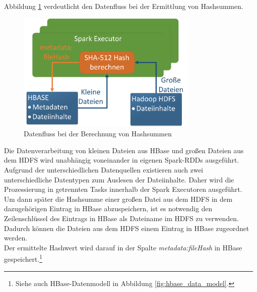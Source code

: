 \noindent
Abbildung \ref{fig:data_processing_hashes} verdeutlicht den Datenfluss bei der Ermittlung von Hashsummen.
\begin{figure}[ht]
  \centering
  \includegraphics[width=0.78\textwidth]{./resource/spark_processing_hashes.png}
  \caption{Datenfluss bei der Berechnung von Hashsummen}
  \label{fig:data_processing_hashes}
\end{figure}

\noindent
Die Datenverarbeitung von kleinen Dateien aus HBase und großen Dateien aus dem HDFS wird unabhängig voneinander in eigenen Spark-RDDs ausgeführt. Aufgrund der unterschiedlichen Datenquellen existieren auch zwei unterschiedliche Datentypen zum Auslesen der Dateiinhalte. Daher wird die Prozessierung in getrennten Tasks innerhalb der Spark Executoren ausgeführt. Um dann später die Hashsumme einer großen Datei aus dem HDFS in dem dazugehörigen Eintrag in HBase abzuspeichern, ist es notwendig den Zeilenschlüssel des Eintrags in HBase als Dateiname im HDFS zu verwenden. Dadurch können die Dateien aus dem HDFS einem Eintrag in HBase zugeordnet werden.\\
Der ermittelte Hashwert wird darauf in der Spalte \textit{metadata:fileHash} in HBase  gespeichert.\footnote{Siehe auch HBase-Datenmodell in Abbildung \ref{fig:hbase_data_model}.}

